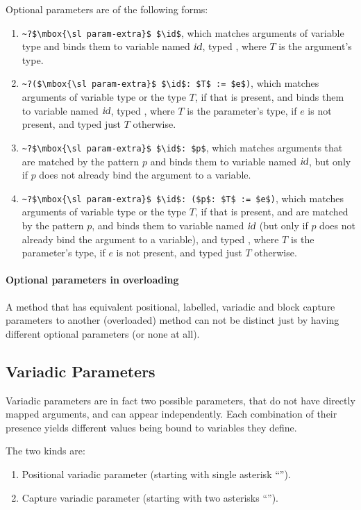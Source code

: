 Optional parameters are of the following forms:
\begin{enumerate}
  \item \lstinline!~?$\mbox{\sl param-extra}$ $\id$!, which matches arguments of variable type and binds them to variable named $\mbox{\sl id}$, typed , where $T$ is the argument's type. 
  \item \lstinline!~?($\mbox{\sl param-extra}$ $\id$: $T$ := $e$)!, which matches arguments of variable type or the type $T$, if that is present, and binds them to variable named $\mbox{\sl id}$, typed , where $T$ is the parameter's type, if $e$ is not present, and typed just $T$ otherwise.
  \item \lstinline!~?$\mbox{\sl param-extra}$ $\id$: $p$!, which matches arguments that are matched by the pattern $p$ and binds them to variable named $\mbox{\sl id}$, but only if $p$ does not already bind the argument to a variable. 
  \item \lstinline!~?$\mbox{\sl param-extra}$ $\id$: ($p$: $T$ := $e$)!, which matches arguments of variable type or the type $T$, if that is present, and are matched by the pattern $p$, and binds them to variable named $\mbox{\sl id}$ (but only if $p$ does not already bind the argument to a variable), and typed , where $T$ is the parameter's type, if $e$ is not present, and typed just $T$ otherwise.
\end{enumerate}

\paragraph{Optional parameters in overloading}
A method that has equivalent positional, labelled, variadic and block capture parameters to another (overloaded) method can not be distinct just by having different optional parameters (or none at all). 





\subsection{Variadic Parameters}
\label{sec:variadic-parameters}

Variadic parameters are in fact two possible parameters, that do not have directly mapped arguments, and can appear independently. Each combination of their presence yields different values being bound to variables they define. 

The two kinds are:
\begin{enumerate}
  \item Positional variadic parameter (starting with single asterisk ``\code{*}''). 
  \item Capture variadic parameter (starting with two asterisks ``\code{**}''). 
\end{enumerate}


